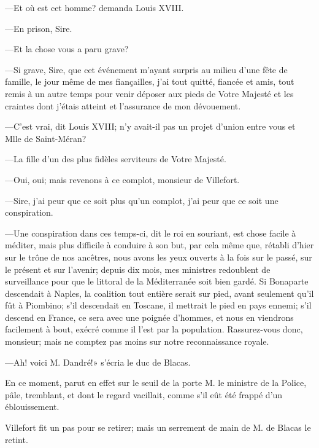 —Et où est cet homme? demanda Louis XVIII.

—En prison, Sire.

—Et la chose vous a paru grave?

—Si grave, Sire, que cet événement m'ayant surpris au milieu d'une fête de famille, le jour même de mes fiançailles, j'ai tout quitté, fiancée et amis, tout remis à un autre temps pour venir déposer aux pieds de Votre Majesté et les craintes dont j'étais atteint et l'assurance de mon dévouement.

—C'est vrai, dit Louis XVIII; n'y avait-il pas un projet d'union entre vous et Mlle de Saint-Méran?

—La fille d'un des plus fidèles serviteurs de Votre Majesté.

—Oui, oui; mais revenons à ce complot, monsieur de Villefort.

—Sire, j'ai peur que ce soit plus qu'un complot, j'ai peur que ce soit une conspiration.

—Une conspiration dans ces temps-ci, dit le roi en souriant, est chose facile à méditer, mais plus difficile à conduire à son but, par cela même que, rétabli d'hier sur le trône de nos ancêtres, nous avons les yeux ouverts à la fois sur le passé, sur le présent et sur l'avenir; depuis dix mois, mes ministres redoublent de surveillance pour que le littoral de la Méditerranée soit bien gardé. Si Bonaparte descendait à Naples, la coalition tout entière serait sur pied, avant seulement qu'il fût à Piombino; s'il descendait en Toscane, il mettrait le pied en pays ennemi; s'il descend en France, ce sera avec une poignée d'hommes, et nous en viendrons facilement à bout, exécré comme il l'est par la population. Rassurez-vous donc, monsieur; mais ne comptez pas moins sur notre reconnaissance royale.

—Ah! voici M. Dandré!» s'écria le duc de Blacas.

En ce moment, parut en effet sur le seuil de la porte M. le ministre de la Police, pâle, tremblant, et dont le regard vacillait, comme s'il eût été frappé d'un éblouissement.

Villefort fit un pas pour se retirer; mais un serrement de main de M. de Blacas le retint.




